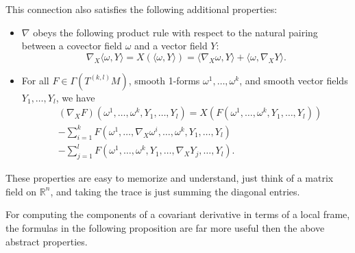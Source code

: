 \documentclass[../main.tex]{subfiles}
\begin{document}
\begin{proposition}{}{}
	This connection also satisfies the following additional properties:
	\begin{itemize}
		\item $\nabla$ obeys the following product rule with respect to the natural pairing between a covector field $\omega$ and a vector field $Y$:
		      \begin{equation}
			      \nabla_X \langle \omega, Y \rangle = X(\langle \omega, Y \rangle) = \langle \nabla_X \omega, Y \rangle + \langle \omega, \nabla_X Y \rangle.
		      \end{equation}
		\item For all $F \in \Gamma(T^{(k, l)} M)$, smooth 1-forms $\omega^1, \ldots, \omega^k$, and smooth vector fields $Y_1, \ldots, Y_l$, we have
		      \begin{equation}
			      \begin{aligned}
				       & (\nabla_X F)(\omega^1, \ldots, \omega^k, Y_1, \ldots, Y_l) = X(F(\omega^1, \ldots, \omega^k, Y_1, \ldots, Y_l)) \\
				       & - \sum_{i=1}^k F(\omega^1, \ldots, \nabla_X \omega^i, \ldots, \omega^k, Y_1, \ldots, Y_l)                       \\
				       & - \sum_{j=1}^l F(\omega^1, \ldots, \omega^k, Y_1, \ldots, \nabla_X Y_j, \ldots, Y_l).
			      \end{aligned}
		      \end{equation}
	\end{itemize}
\end{proposition}

\begin{remark}
	These properties are easy to memorize and understand, just think of a matrix field on $\mathbb{R}^n$, and taking the trace is just summing the diagonal entries.
\end{remark}

For computing the components of a covariant derivative in terms of a local frame, the formulas in the following proposition are far more useful then the above abstract properties.
\end{document}
